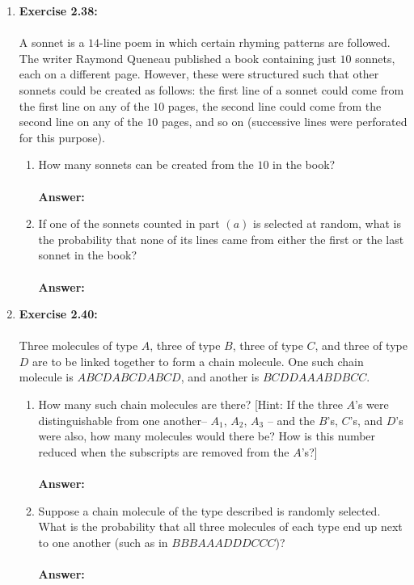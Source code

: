 \documentclass[12pt]{article}
\theoremstyle{homework}
\begin{document}
\begin{enumerate}
\item\hspace{.5in}\textbf{Exercise 2.38:} \\
\\
A sonnet is a $14$-line poem in which certain rhyming patterns are followed. The writer Raymond Queneau published a book containing just $10$ sonnets, each on a different page. However, these were structured such that other sonnets could be created as follows: the first line of a sonnet could come from the first line on any of the $10$ pages, the second line could come from the second line on any of the $10$ pages, and so on (successive lines were perforated for this purpose).
\begin{enumerate}
\item How many sonnets can be created from the $10$ in the book?\\
\\
 \textbf{Answer:}
 \\
\item If one of the sonnets counted in part $(a)$ is selected at random, what is the probability that none of its lines came from either the first or the last sonnet in the book?\\
\\
 \textbf{Answer:}
 \\
\end{enumerate}
\vspace{1in}


\item\hspace{.5in}\textbf{Exercise 2.40:} \\
\\
Three molecules of type $A$, three of type $B$, three of type $C$, and three of type $D$ are to be linked together to form a chain molecule. One such chain molecule is $ABCDABCDABCD$, and another is $BCDDAAABDBCC$.
\begin{enumerate}
\item How many such chain molecules are there? [Hint: If the three $A$’s were distinguishable from one another-- $A_1$, $A_2$, $A_3$ -- and the $B$’s, $C$’s, and $D$’s were also, how many molecules would there be? How is this number reduced when the subscripts are removed from the $A$’s?]\\
\\
 \textbf{Answer:}
 \\
\item Suppose a chain molecule of the type described is randomly selected. What is the probability that all three molecules of each type end up next to one another (such as in $BBBAAADDDCCC$)?\\
\\
 \textbf{Answer:}
 \\
\end{enumerate}
\vspace{1in}



\end{enumerate}
\end{document}
